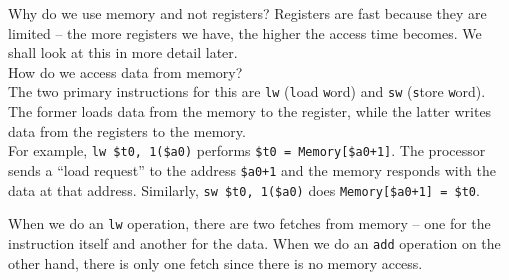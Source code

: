\documentclass{article}
\begin{document}

		Why do we use memory and not registers? Registers are fast because they are limited -- the more registers we have, the higher the access time becomes. We shall look at this in more detail later.\\

		How do we access data from memory?\\
		The two primary instructions for this are \texttt{lw} (\texttt{l}oad \texttt{w}ord) and \texttt{sw} (\texttt{s}tore \texttt{w}ord). The former loads data from the memory to the register, while the latter writes data from the registers to the memory.\\
		For example, \texttt{lw \$t0, 1(\$a0)} performs \texttt{\$t0 = Memory[\$a0+1]}. The processor sends a ``load request'' to the address \texttt{\$a0+1} and the memory responds with the data at that address. Similarly, \texttt{sw \$t0, 1(\$a0)} does \texttt{Memory[\$a0+1] = \$t0}.

		When we do an \texttt{lw} operation, there are two fetches from memory -- one for the instruction itself and another for the data. When we do an \texttt{add} operation on the other hand, there is only one fetch since there is no memory access.

\end{document}
